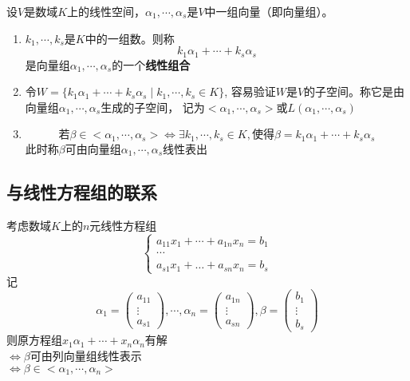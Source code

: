 \begin{definition}
    设$V$是数域$K$上的线性空间，$\alpha_1, \cdots, \alpha_s$是$V$中一组向量（即向量组）。
    \begin{enumerate}
        \item $k_1, \cdots, k_s$是$K$中的一组数。则称
        \begin{equation*}
            k_1\alpha_1 + \cdots + k_s\alpha_s
        \end{equation*}
        是向量组$\alpha_1, \cdots, \alpha_s$的一个\textbf{线性组合}

        \item 令$W = \{k_1\alpha_1 + \cdots + k_s\alpha_s \mid k_1, \cdots, k_s \in K\}$,
        容易验证$W$是$V$的子空间。称它是由向量组$\alpha_1, \cdots, \alpha_s$生成的子空间，
        记为$<\alpha_1, \cdots, \alpha_s>$或$L(\alpha_1, \cdots, \alpha_s)$
       
        \item \begin{equation*}
            \text{若}\beta \in <\alpha_1, \cdots, \alpha_s>
            \Leftrightarrow \exists k_1, \cdots, k_s \in K, \text{使得} \beta = k_1\alpha_1 + \cdots + k_s\alpha_s
        \end{equation*}
        此时称$\beta$可由向量组$\alpha_1, \cdots, \alpha_s$线性表出
    \end{enumerate} 
       
\end{definition}

\subsection*{与线性方程组的联系}
考虑数域$K$上的$n$元线性方程组
\begin{equation*}
    \begin{cases}
        a_{11}x_1+\cdots+a_{1n}x_n=b_{1}\\
        \cdots\\
        a_{s1}x_1+\dots+a_{sn}x_n=b_{s}
    \end{cases}
\end{equation*}
记
\begin{equation*}
    \alpha_1 = \begin{pmatrix}
        a_{11}\\ \vdots \\ a_{s1}
    \end{pmatrix}
    , \cdots, 
    \alpha_n = \begin{pmatrix}
        a_{1n}\\ \vdots \\ a_{sn}
    \end{pmatrix},
    \beta = \begin{pmatrix}
        b_1 \\ \vdots \\ b_s
    \end{pmatrix}
\end{equation*}
则原方程组$x_1\alpha_1 + \cdots + x_n\alpha_n$有解\\
$\Leftrightarrow$$\beta$可由列向量组线性表示\\
$\Leftrightarrow$$\beta \in <\alpha_1, \cdots, \alpha_n>$

